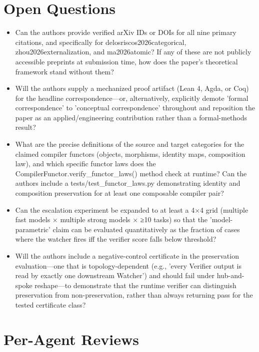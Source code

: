 \documentclass[11pt]{article}
\begin{document}
\section*{Open Questions}
\begin{itemize}[leftmargin=*]
  \item Can the authors provide verified arXiv IDs or DOIs for all nine primary citations, and specifically for delosriscos2026categorical, zhou2026externalization, and ma2026atomic? If any of these are not publicly accessible preprints at submission time, how does the paper's theoretical framework stand without them?
  \item Will the authors supply a mechanized proof artifact (Lean 4, Agda, or Coq) for the headline correspondence—or, alternatively, explicitly demote 'formal correspondence' to 'conceptual correspondence' throughout and reposition the paper as an applied/engineering contribution rather than a formal-methods result?
  \item What are the precise definitions of the source and target categories for the claimed compiler functors (objects, morphisms, identity maps, composition law), and which specific functor laws does the CompilerFunctor.verify\_functor\_laws() method check at runtime? Can the authors include a tests/test\_functor\_laws.py demonstrating identity and composition preservation for at least one composable compiler pair?
  \item Can the escalation experiment be expanded to at least a 4×4 grid (multiple fast models × multiple strong models × ≥10 tasks) so that the 'model-parametric' claim can be evaluated quantitatively as the fraction of cases where the watcher fires iff the verifier score falls below threshold?
  \item Will the authors include a negative-control certificate in the preservation evaluation—one that is topology-dependent (e.g., 'every Verifier output is read by exactly one downstream Watcher') and should fail under hub-and-spoke reshape—to demonstrate that the runtime verifier can distinguish preservation from non-preservation, rather than always returning pass for the tested certificate class?
\end{itemize}

\section*{Per-Agent Reviews}
\end{document}
